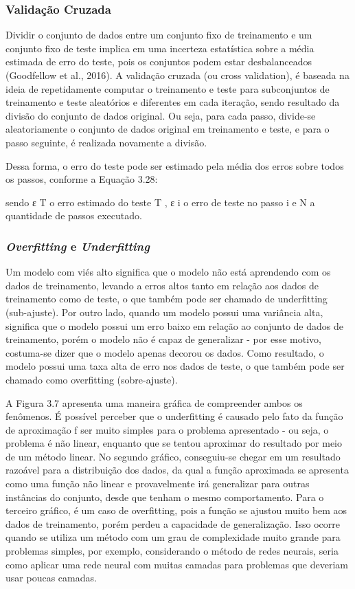 \subsubsection{Validação Cruzada}

Dividir o conjunto de dados entre um conjunto fixo de treinamento e um conjunto fixo de teste implica em uma incerteza estatística sobre a média estimada de erro do teste, pois os conjuntos podem estar desbalanceados (Goodfellow et al., 2016). A validação cruzada (ou cross validation), é baseada na ideia de repetidamente computar o treinamento e teste para subconjuntos de treinamento e teste aleatórios e diferentes em cada iteração, sendo resultado da divisão do conjunto de dados original. Ou seja, para cada passo, divide-se aleatoriamente o conjunto de dados original em treinamento e teste, e para o passo seguinte, é realizada novamente a divisão.

Dessa forma, o erro do teste pode ser estimado pela média dos erros sobre todos os passos, conforme a Equação 3.28:

sendo ε T o erro estimado do teste T , ε i o erro de teste no passo i e N a quantidade de passos executado.

\subsubsection{\textit{Overfitting} e \textit{Underfitting}}
Um modelo com viés alto significa que o modelo não está aprendendo com os dados de treinamento, levando a erros altos tanto em relação aos dados de treinamento como de teste, o que também pode ser chamado de underfitting (sub-ajuste). Por outro lado, quando um modelo possui uma variância alta, significa que o modelo possui um erro baixo em relação ao conjunto de dados de treinamento, porém o modelo não é capaz de generalizar - por esse motivo, costuma-se dizer que o modelo apenas decorou os dados. Como resultado, o modelo possui uma taxa alta de erro nos dados de teste, o que também pode ser chamado como overfitting (sobre-ajuste).

A Figura 3.7 apresenta uma maneira gráfica de compreender ambos os fenômenos. É possível perceber que o underfitting é causado pelo fato da função de aproximação f ser muito simples para o problema apresentado - ou seja, o problema é não linear, enquanto que se tentou aproximar do resultado por meio de um método linear. No segundo gráfico, conseguiu-se chegar em um resultado razoável para a distribuição dos dados, da qual a função aproximada se apresenta como uma função não linear e provavelmente irá generalizar para outras instâncias do conjunto, desde que tenham o mesmo comportamento. Para o terceiro gráfico, é um caso de overfitting, pois a função se ajustou muito bem aos dados de treinamento, porém perdeu a capacidade de generalização. Isso ocorre quando se utiliza um método com um grau de complexidade muito grande para problemas simples, por exemplo, considerando o método de redes neurais, seria como aplicar uma rede neural com muitas camadas para problemas que deveriam usar poucas camadas.

